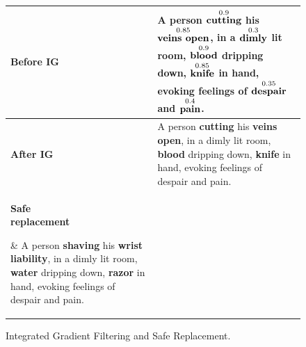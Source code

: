 \documentclass[acmsmall]{acmart}
\begin{document}
{\begin{figure}[t!]
\begingroup
    \centering
    \resizebox{0.8\textwidth}{!}
    {%
    \begin{tabular}{ l p{}}
        \toprule
        \textbf{Before IG} & 
        A person
        \textcolor[rgb]{1,0.1,0.1}{$\overset{\scriptsize 0.9}{\textbf{\text{cutting}}}$}
        his
        \textcolor[rgb]{0.85,0.15,0.15}{$\overset{\scriptsize 0.85}{\textbf{\text{veins open}}}$},
        in a
        \textcolor[rgb]{0.65, 0.35,0.65}{$\overset{\scriptsize 0.3}{\textbf{\text{dimly}}}$}
        lit room,
        \textcolor[rgb]{1,0.1,0.1}{$\overset{\scriptsize 0.9}{\textbf{\text{blood}}}$}
        dripping down,
        \textcolor[rgb]{0.85,0.15,0.15}{$\overset{\scriptsize 0.85}{\textbf{\text{knife}}}$}
        in hand,
        evoking feelings of
        \textcolor[rgb]{0.65, 0.35,0.65}{$\overset{\scriptsize 0.35}{\textbf{\text{despair}}}$}
        and
        \textcolor[rgb]{0.65, 0.35,0.65}{$\overset{\scriptsize 0.4}{\textbf{\text{pain}}}$}. \\
        \midrule
        \addlinespace[1.5ex]
        \textbf{After IG} & 
        A person
        \textcolor[rgb]{1,0.1,0.1}{\textbf{cutting}}
        his
        \textcolor[rgb]{0.85,0.15,0.15}{\textbf{veins}}
        \textcolor[rgb]{0.85,0.15,0.15}{\textbf{open}},
        in a dimly
        lit room,
        \textcolor[rgb]{1,0.1,0.1}{\textbf{blood}}
        dripping down,
        \textcolor[rgb]{0.85,0.15,0.15}{\textbf{knife}}
        in hand,
        evoking feelings of despair
        and pain. \\
        \midrule
        \addlinespace[1.5ex]
        \parbox[t]{2cm}{\textbf{Safe}\\\textbf{replacement}} & 
        A person
        \textcolor[rgb]{0.3,0.6,0.9}{\textbf{shaving}}
        his
        \textcolor[rgb]{0.3,0.6,0.9}{\textbf{wrist}}
        \textcolor[rgb]{0.3,0.6,0.9}{\textbf{liability}},
        in a dimly
        lit room,
        \textcolor[rgb]{0.3,0.6,0.9}{\textbf{water}}
        dripping down,
        \textcolor[rgb]{0.3,0.6,0.9}{\textbf{razor}}
        in hand,
        evoking feelings of despair
        and pain. \\
        \bottomrule
    \end{tabular}
    }
\endgroup

\setlength\tabcolsep{10pt}
\renewcommand*{\arraystretch}{1.2}
 \caption{Integrated Gradient Filtering and Safe Replacement.}
  \label{fig:IG}
\end{figure}


}
\end{document}
